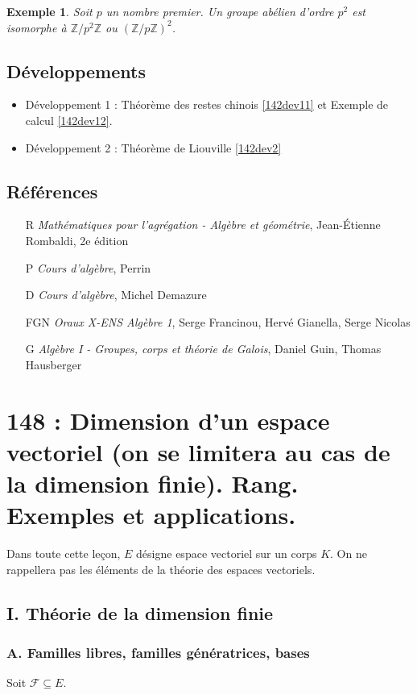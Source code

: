 \documentclass[10pt, a4paper, parskip=full, twoside, twocolumn]{report}
\newtheorem{example}[definition]{Exemple}
\newcommand{\IZ}{\mathbb{Z}}
\begin{document}
\begin{example}
	Soit $p$ un nombre premier. Un groupe abélien d'ordre $p^2$
	est isomorphe à $\IZ/p^2\IZ$ ou $\left(\IZ/p\IZ\right)^2$.
\end{example}

\section*{Développements}
\begin{itemize}
	\item Développement 1 : Théorème des restes chinois \ref{142dev11} et Exemple de calcul \ref{142dev12}.
	\item Développement 2 : Théorème de Liouville \ref{142dev2}
\end{itemize}

\section*{Références}
\begin{itemize}
	\item[R] \emph{Mathématiques pour l'agrégation - Algèbre et géométrie}, Jean-Étienne Rombaldi, 2e édition
	\item[P] \emph{Cours d'algèbre}, Perrin
	\item[D] \emph{Cours d'algèbre}, Michel Demazure
	\item[FGN] \emph{Oraux X-ENS Algèbre 1}, Serge Francinou, Hervé Gianella, Serge Nicolas  
	\item[G] \emph{Algèbre I - Groupes, corps et théorie de Galois}, Daniel Guin, Thomas Hausberger 
\end{itemize}


\chapter*{148 : Dimension d'un espace vectoriel (on se limitera au cas de la dimension finie). Rang. Exemples et applications.}
\setcounter{definition}{0}
\textcolor{paragraphtext}{Dans toute cette leçon, $E$ désigne espace vectoriel sur un corps $K$.
On ne rappellera pas les éléments de la théorie des espaces vectoriels.}

\section*{I. Théorie de la dimension finie}
\subsection*{A. Familles libres, familles génératrices, bases}
\textcolor{paragraphtext}{Soit $\mathcal{F}\subseteq E$.}
\end{document}
